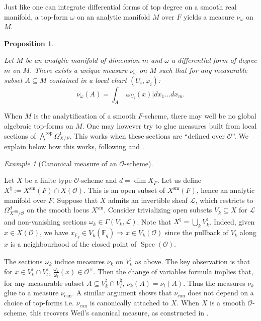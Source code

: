 \documentclass[11pt,english]{article}
\numberwithin{equation}{section}
\numberwithin{figure}{section}
\theoremstyle{definition}
\theoremstyle{plain}
\newtheorem{prop}[df]{Proposition}
\theoremstyle{remark}
\newtheorem{exmp}[df]{Example}
\DeclareMathOperator{\Spec}{Spec}
\begin{document}
Just like one can integrate differential forms of top degree on a
smooth real manifold, a top-form $\omega$ on an analytic manifold
$M$ over $F$ yields a measure $\nu_{\omega}$ on $M$.

\begin{prop}{\cite[\S 7.4.]{Igu00}}

Let $M$ be an analytic manifold of dimension $m$ and $\omega$ a
differential form of degree $m$ on $M$. There exists a unique measure
$\nu_{\omega}$ on $M$ such that for any measurable subset $A\subseteq M$
contained in a local chart $(U_{i},\varphi_{i})$:\[
\nu_{\omega}(A)=\int_{A}\vert\omega_{U_i}(x)\vert dx_1\ldots dx_m.
\]

\end{prop}

When $M$ is the analytification of a smooth $F$-scheme, there may
well be no global algebraic top-forms on $M$. One may however try
to glue measures built from local sections of $\bigwedge^{\mathrm{top}}\Omega_{X/F}^{1}$.
This works when these sections are ``defined over $\mathcal{O}$''.
We explain below how this works, following \cite[\S 4]{Yas17} and
\cite[\S 3]{COW21}.

\begin{exmp}[Canonical measure of an $\mathcal{O}$-scheme]
\label{Exmp/CanMeas}

Let $X$ be a finite type $\ensuremath{\mathcal{O}}$-scheme and $d=\dim X_{F}$.
Let us define $X^{\natural}:=X^{\mathrm{sm}}(F)\cap X(\mathcal{O})$.
This is an open subset of $X^{\mathrm{sm}}(F)$, hence an analytic
manifold over $F$. Suppose that $X$ admits an invertible sheaf $\ensuremath{\mathcal{L}}$,
which restricts to $\Omega_{X^{\mathrm{sm}}/\mathcal{O}}^{d}$ on
the smooth locus $X^{\mathrm{sm}}$. Consider trivializing open subsets
$V_{k}\subseteq X$ for $\ensuremath{\mathcal{L}}$ and non-vanishing
sections $\omega_{k}\in\Gamma(V_{k},\ensuremath{\mathcal{L}})$. Note
that $X^{\natural}=\bigcup_{k}V_{k}^{\natural}$. Indeed, given $x\in X(\mathcal{O})$,
we have $x_{\mathbb{F}_{q}}\in V_{k}(\mathbb{F}_{q})\Rightarrow x\in V_{k}(\mathcal{O})$
since the pullback of $V_{k}$ along $x$ is a neighbourhood of the
closed point of $\Spec(\mathcal{O})$.

The sections $\omega_{k}$ induce measures $\nu_{k}$ on $V_{k}^{\natural}$
as above. The key observation is that for $x\in V_{k}^{\natural}\cap V_{l}^{\natural}$,
$\frac{\omega_{k}}{\omega_{l}}(x)\in\mathcal{O}^{\times}$. Then the
change of variables formula implies that, for any measurable subset
$A\subseteq V_{k}^{\natural}\cap V_{l}^{\natural}$, $\nu_{k}(A)=\nu_{l}(A)$.
Thus the measures $\nu_{k}$ glue to a measure $\nu_{\mathrm{can}}$.
A similar argument shows that $\nu_{\mathrm{can}}$ does not depend
on a choice of top-forms i.e. $\nu_{\mathrm{can}}$ is canonically
attached to $X$. When $X$ is a smooth $\mathcal{O}$-scheme, this
recovers Weil's canonical measure, as constructed in \cite[Ch. II, \S 2.2.]{Wei12}.

\end{exmp}
\end{document}
